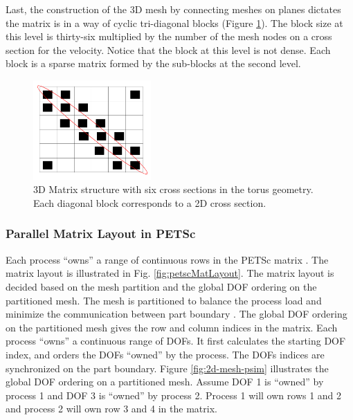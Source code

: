 \documentclass[11pt]{article}  %
\begin{document}
 Last, the construction of the 3D mesh by connecting meshes on planes dictates the matrix is in a way of cyclic tri-diagonal blocks (Figure \ref{fig:3DMatrix}).  The block size at this level is  thirty-six  multiplied by the number of the mesh nodes on a cross section for the velocity. Notice that the block at this level is not dense. Each block is a sparse matrix formed by the sub-blocks at the second level. 

\begin{figure}[hbt]
\center
\includegraphics[width=0.4\textwidth]{fig/3DMatrix.png}
\caption{3D Matrix structure with six cross sections in the torus geometry. Each diagonal block corresponds to a 2D cross section.} \label{fig:3DMatrix}
\end{figure} 

\subsubsection{Parallel Matrix Layout in PETSc} \label{sec:petsMatLayout}

Each process ``owns'' a range of continuous rows in the PETSc matrix \cite{petsc-web-page}.  The matrix layout is illustrated in Fig. \ref{fig:petscMatLayout}.
The matrix layout  is decided based on the mesh partition and the global DOF ordering on the partitioned mesh. The mesh is partitioned to balance the process load and minimize the communication between part boundary \cite{zhou2012unstructured}. The global  DOF ordering on the partitioned mesh gives the row and column indices in the matrix.  Each process ``owns'' a continuous range of DOFs. It first calculates the starting DOF index, and orders the DOFs ``owned'' by the process. The DOFs indices are synchronized on the  part boundary.  Figure \ref{fig:2d-mesh-psim} illustrates the global DOF ordering on a partitioned mesh. Assume DOF 1 is ``owned'' by process 1 and DOF 3 is ``owned'' by process 2.  Process 1 will own rows 1 and 2 and process 2 will own row 3 and 4 in the matrix.
\end{document}
